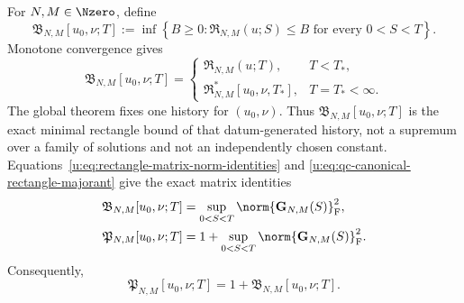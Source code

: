 \begin{definition}
\label{u:def:qc-canonical-majorants}
For \(N,M\in\Nzero\), define
\begin{equation}
 \mathfrak B_{N,M}[u_0,\nu;T]
 :=\inf\left\{B\ge0:
 \mathfrak R_{N,M}(u;S)\le B
 \text{ for every }0<S<T\right\}.
 \label{u:eq:qc-canonical-rectangle-majorant}
\end{equation}
Monotone convergence gives
\begin{equation}
 \mathfrak B_{N,M}[u_0,\nu;T]
 =\begin{cases}
   \mathfrak R_{N,M}(u;T),&T<T_*,\\
   \mathfrak R_{N,M}^*[u_0,\nu,T_*],&T=T_*<\infty.
  \end{cases}
 \label{u:eq:qc-canonical-rectangle-identification}
\end{equation}
The global theorem fixes one history for \((u_0,\nu)\).  Thus
\(\mathfrak B_{N,M}[u_0,\nu;T]\) is the exact minimal rectangle bound of
that datum-generated history, not a supremum over a family of solutions and
not an independently chosen constant.
Equations~\eqref{u:eq:rectangle-matrix-norm-identities} and
\eqref{u:eq:qc-canonical-rectangle-majorant} give the exact matrix identities
\begin{align}
 \mathfrak B_{N,M}[u_0,\nu;T]
 &=\sup_{0<S<T}\norm{\mathbf G_{N,M}(S)}_{\mathrm F}^2,
 \label{u:eq:qc-B-matrix-identity}\\
 \mathfrak P_{N,M}[u_0,\nu;T]
 &=1+\sup_{0<S<T}\norm{\mathbf G_{N,M}(S)}_{\mathrm F}^2.
 \label{u:eq:qc-P-matrix-identity}
\end{align}
Consequently,
\begin{equation}
 \mathfrak P_{N,M}[u_0,\nu;T]
 =1+\mathfrak B_{N,M}[u_0,\nu;T].
 \label{u:eq:qc-producer-through-B}
\end{equation}


\end{definition}
